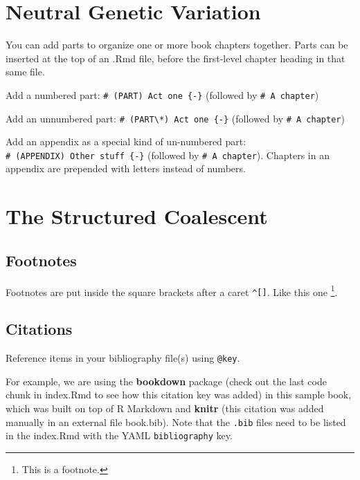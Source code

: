 \documentclass[
]{book}
\theoremstyle{definition}
\theoremstyle{definition}
\theoremstyle{definition}
\theoremstyle{definition}
\theoremstyle{remark}
\begin{document}
\hypertarget{neutral-genetic-variation}{%
\chapter{Neutral Genetic Variation}\label{neutral-genetic-variation}}

You can add parts to organize one or more book chapters together. Parts can be inserted at the top of an .Rmd file, before the first-level chapter heading in that same file.

Add a numbered part: \texttt{\#\ (PART)\ Act\ one\ \{-\}} (followed by \texttt{\#\ A\ chapter})

Add an unnumbered part: \texttt{\#\ (PART\textbackslash{}*)\ Act\ one\ \{-\}} (followed by \texttt{\#\ A\ chapter})

Add an appendix as a special kind of un-numbered part: \texttt{\#\ (APPENDIX)\ Other\ stuff\ \{-\}} (followed by \texttt{\#\ A\ chapter}). Chapters in an appendix are prepended with letters instead of numbers.

\hypertarget{the-structured-coalescent}{%
\chapter{The Structured Coalescent}\label{the-structured-coalescent}}

\hypertarget{footnotes}{%
\section{Footnotes}\label{footnotes}}

Footnotes are put inside the square brackets after a caret \texttt{\^{}{[}{]}}. Like this one \footnote{This is a footnote.}.

\hypertarget{citations}{%
\section{Citations}\label{citations}}

Reference items in your bibliography file(s) using \texttt{@key}.

For example, we are using the \textbf{bookdown} package \citep{R-bookdown} (check out the last code chunk in index.Rmd to see how this citation key was added) in this sample book, which was built on top of R Markdown and \textbf{knitr} \citep{xie2015} (this citation was added manually in an external file book.bib).
Note that the \texttt{.bib} files need to be listed in the index.Rmd with the YAML \texttt{bibliography} key.
\end{document}
